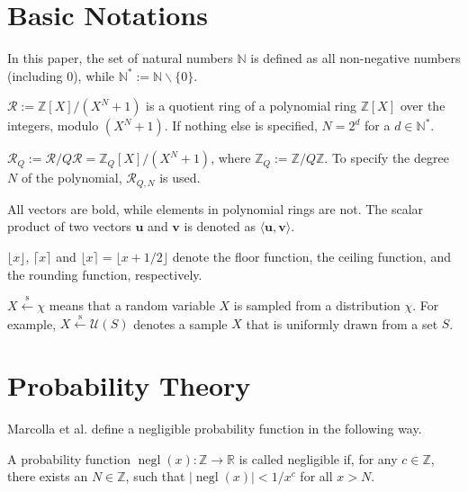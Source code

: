 \section{Basic Notations}

In this paper, the set of natural numbers $\mathbb{N}$ is defined as all non-negative numbers (including 0), while $\mathbb{N}^* := \mathbb{N}\backslash\{0\}$.

$\mathcal{R} := \mathbb{Z}[X] / (X^N + 1)$ is a quotient ring of a polynomial ring $\mathbb{Z}[X]$ over the integers, modulo $(X^N + 1)$. If nothing else is specified, $N = 2^d$ for a $d \in \mathbb{N}^*$.

$\mathcal{R}_Q := \mathcal{R} /  Q\mathcal{R} = \mathbb{Z}_Q[X] / (X^N + 1)$, where $\mathbb{Z}_Q := \mathbb{Z} /  Q \mathbb{Z}$. To specify the degree $N$ of the polynomial, $\mathcal{R}_{Q, N}$ is used.

All vectors are bold, while elements in polynomial rings are not. The scalar product of two vectors $\mathbf{u}$ and $\mathbf{v}$ is denoted as $\langle \mathbf{u}, \mathbf{v} \rangle$.

$\lfloor x \rfloor$, $\lceil x \rceil$ and $\lfloor x \rceil = \lfloor x + 1/2 \rfloor$ denote the floor function, the ceiling function, and the rounding function, respectively.

$X \xleftarrow{\text{s}} \chi$ means that a random variable $X$ is sampled from a distribution $\chi$. For example, $X \xleftarrow{\text{s}} \mathcal{U}(S)$ denotes a sample $X$ that is uniformly drawn from a set $S$.




\section{Probability Theory}

Marcolla et al. \cite{cite:QianFHE} define a negligible probability function in the following way.
\begin{definition}
    A probability function \linebreak $\operatorname{negl}(x): \mathbb{Z} \to \mathbb{R}$ is called negligible if, for any $c \in \mathbb{Z}$, there exists an $N \in \mathbb{Z}$, such that $|\operatorname{negl}(x)| < 1/x^c$ for all $x > N$. 
\end{definition}

